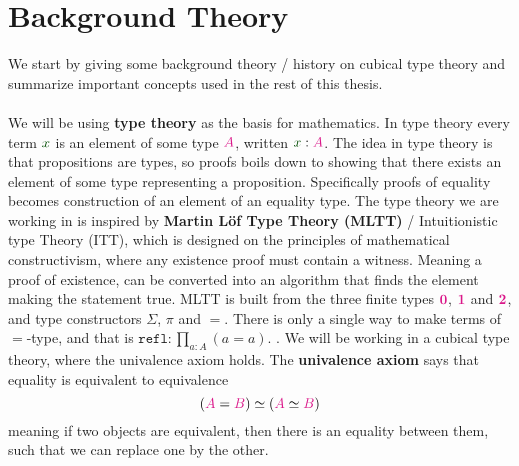 \documentclass[twoside,11pt,openright]{report}
\theoremstyle{plain} %
\theoremstyle{definition}
\theoremstyle{remark}
\newcommand*{\term}[1]{\textcolor{green!30!black}{#1}} %
\newcommand*{\type}[1]{\textcolor{magenta!90!black}{#1}}
\newcommand*{\unit}{\type{\textbf{1}}}
\newcommand*{\empt}{\type{\textbf{0}}}
\begin{document}
\section{Background Theory}
We start by giving some background theory / history on cubical type theory and summarize important concepts used in the rest of this thesis. 
\\ \\
We will be using \textbf{type theory} as the basis for mathematics. In type theory every term \(\term{x}\) is an element of some type \(\type{A}\), written \(\term{x} : \type{A}\). The idea in type theory is that propositions are types, so proofs boils down to showing that there exists an element of some type representing a proposition. Specifically proofs of equality becomes construction of an element of an equality type. The type theory we are working in is inspired by \textbf{Martin L\"of Type Theory (MLTT)} / Intuitionistic type Theory (ITT), which is designed on the principles of mathematical constructivism, where any existence proof must contain a witness. Meaning a proof of existence, can be converted into an algorithm that finds the element making the statement true. MLTT is built from the three finite types \(\empt\), \(\unit\) and \(\type{\mathbf{2}}\), and type constructors \(\Sigma\), \(\pi\) and \(=\). There is only a single way to make terms of \(=\)-type, and that is \(\mathtt{refl} : \prod_{a : A} (a = a)\).   . We will be working in a cubical type theory, where the univalence axiom holds. The \textbf{univalence axiom} says that equality is equivalent to equivalence
\begin{equation}
  (\type{A} = \type{B}) \simeq (\type{A} \simeq \type{B})
\end{equation}
meaning if two objects are equivalent, then there is an equality between them, such that we can replace one by the other.
\\ \\
\end{document}
